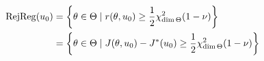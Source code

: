 \message{ !name(Chapter3.tex)}\documentclass[../../Main_ManuscritThese.tex]{subfiles}
\begin{document}
\begin{align}
    \mathrm{RejReg}(u_0) &= \left\{\theta\in\Theta \mid r(\theta, u_0) \geq \frac{1}{2}\chi^2_{\dim \Theta}(1-\nu) \right\} \\
    &= \left\{\theta\in\Theta \mid J(\theta, u_0) - J^*(u_0) \geq \frac{1}{2}\chi^2_{\dim \Theta}(1-\nu) \right\}
  \end{align}
\end{document}
